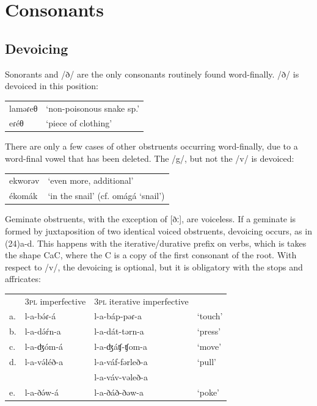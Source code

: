 \section{Consonants}
\subsection{Devoicing}
Sonorants and /ð/ are the only consonants routinely found word-finally. /ð/ is devoiced in this position:
\ea
\begin{tabular}[t]{ll}
	laməɾeθ	&	‘non-poisonous snake sp.’\\
	eɾéθ	&	‘piece of clothing’\\
\end{tabular}
\z

There are only a few cases of other obstruents occurring word-finally, due to a word-final vowel that has been deleted. The /g/, but not the /v/ is devoiced:

\ea
\begin{tabular}[t]{ll}
	ekworəv		&	‘even more, additional’\\
	ékomák		&	‘in the snail’	(cf. omágá ‘snail’)\\
\end{tabular}
\z

Geminate obstruents, with the exception of [ðː], are voiceless. If a geminate is formed by juxtaposition of two identical voiced obstruents, devoicing occurs, as in (24)a-d. This happens with the iterative/durative prefix on verbs, which is takes the shape CaC, where the C is a copy of the first consonant of the root. With respect to /v/, the devoicing is optional, but it is obligatory with the stops and affricates:

\ea
\begin{tabular}[t]{llll}
&	3\textsc{pl} imperfective	&	3\textsc{pl} iterative imperfective\\
a.	&	l-a-bə́ɾ-á	&	l-a-báp-pəɾ-a	&	‘touch’\\
b.	&	l-a-də́ŕn-a	&	l-a-dát-tərn-a	&	‘press’\\
c.	&	l-a-ʤóm-á	&	l-a-ʤáʧ-ʧom-a	&	‘move’\\
d.	&	l-a-və́léð-a	&	l-a-váf-fərleð-a	&	‘pull’\\
&&	l-a-váv-vəleð-a\\
e.	&	l-a-ðə́w-á	&	l-a-ðáð-ðəw-a		&	‘poke’\\
\end{tabular}
\z

